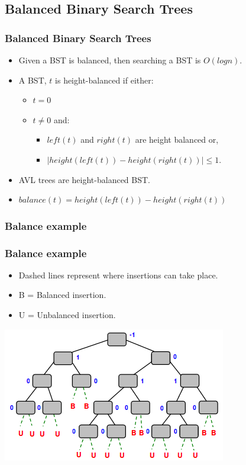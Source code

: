 \documentclass{beamer}
\begin{document}
\subsection{Balanced Binary Search Trees}
\begin{frame}
\frametitle{Balanced Binary Search Trees}
\begin{itemize}
\item Given a BST is balanced, then searching a BST is $O(logn)$.
\item A BST, $t$ is {\color{red} height-balanced} if either:
\begin{itemize}
\item $t = 0$
\item $t \neq 0$ and:
\begin{itemize}
\item $left(t)$ and $right(t)$ are height balanced or,
\item $| height(left(t)) - height(right(t))| \leq 1$.
\end{itemize}
\end{itemize}
\item AVL trees are height-balanced BST.
\item $balance(t) = height(left(t)) - height(right(t))$
\end{itemize}
\end{frame}
\subsubsection{Balance example}
\begin{frame}
\frametitle{Balance example}
\begin{itemize}
\item Dashed lines represent where insertions can take place.
\item B = Balanced insertion.
\item U = Unbalanced insertion.
\end{itemize}
\includegraphics[scale=0.5]{balanced.png}
\end{frame}
\end{document}
